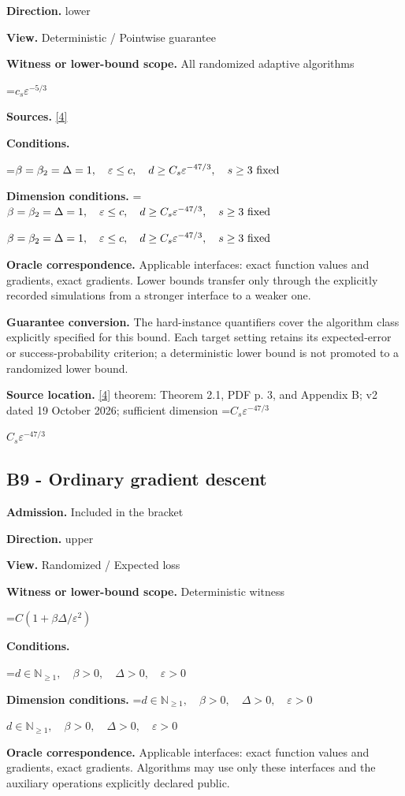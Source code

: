 \documentclass[10pt,a4paper]{article}
\newcommand{\AtlasMath}[1]{\par\begingroup\centering\setbox0=\hbox{$\displaystyle #1$}\ifdim\wd0>1.4\linewidth\typeout{ATLAS WIDE FORMULA: \the\wd0}\fi\ifdim\wd0>\linewidth\resizebox{\linewidth}{!}{\box0}\else\box0\fi\par\endgroup}
\newcommand{\AtlasInlineMath}[1]{\begingroup\setbox0=\hbox{$#1$}\ifdim\wd0>.4\linewidth\endgroup\AtlasMath{#1}\else\endgroup$#1$\fi}
\begin{document}
\textbf{Direction.} lower

\textbf{View.} Deterministic / Pointwise guarantee

\textbf{Witness or lower-bound scope.} All randomized adaptive algorithms

\AtlasMath{c_s\varepsilon^{-5/3}}
\textbf{Sources.} \href{https://arxiv.org/pdf/2610.17074v2}{[4]}

\textbf{Conditions.} 
\AtlasMath{\beta=\beta_2=\Delta=1,\quad\varepsilon\le c,\quad d\ge C_s\varepsilon^{-47/3},\quad s\ge3\text{ \text{fixed}}}


\textbf{Dimension conditions.} \AtlasInlineMath{\beta=\beta_2=\Delta=1,\quad\varepsilon\le c,\quad d\ge C_s\varepsilon^{-47/3},\quad s\ge3\text{ \text{fixed}}}

\textbf{Oracle correspondence.} Applicable interfaces: exact function values and gradients, exact gradients. Lower bounds transfer only through the explicitly recorded simulations from a stronger interface to a weaker one.

\textbf{Guarantee conversion.} The hard-instance quantifiers cover the algorithm class explicitly specified for this bound. Each target setting retains its expected-error or success-probability criterion; a deterministic lower bound is not promoted to a randomized lower bound.

\textbf{Source location.} \href{https://arxiv.org/pdf/2610.17074v2}{[4]} theorem: Theorem 2.1, PDF p. 3, and Appendix B; v2 dated 19 October 2026; sufficient dimension \AtlasInlineMath{C_s\varepsilon^{-47/3}}

\subsection{B9 - Ordinary gradient descent}
\textbf{Admission.} Included in the bracket

\textbf{Direction.} upper

\textbf{View.} Randomized / Expected loss

\textbf{Witness or lower-bound scope.} Deterministic witness

\AtlasMath{C(1+\beta\Delta/\varepsilon^2)}
\textbf{Conditions.} 
\AtlasMath{d\in\mathbb{N}_{\ge1},\quad \beta>0,\quad \Delta>0,\quad \varepsilon>0}


\textbf{Dimension conditions.} \AtlasInlineMath{d\in\mathbb{N}_{\ge1},\quad \beta>0,\quad \Delta>0,\quad \varepsilon>0}

\textbf{Oracle correspondence.} Applicable interfaces: exact function values and gradients, exact gradients. Algorithms may use only these interfaces and the auxiliary operations explicitly declared public.
\end{document}
